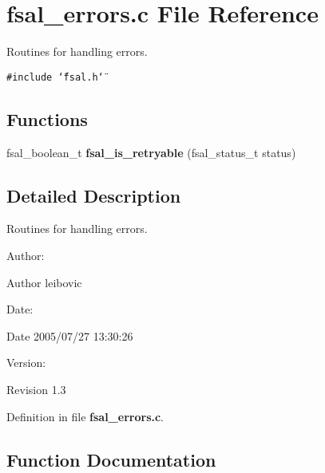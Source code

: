 \section{fsal\_\-errors.c File Reference}
\label{fsal__errors_8c}
Routines for handling errors.  


{\tt \#include \char`\"{}fsal.h\char`\"{}}\par
\subsection*{Functions}
\begin{CompactItemize}
\item 
fsal\_\-boolean\_\-t {\bf fsal\_\-is\_\-retryable} (fsal\_\-status\_\-t status)
\end{CompactItemize}


\subsection{Detailed Description}
Routines for handling errors. 

\begin{Desc}
\item[Author:]\end{Desc}
\begin{Desc}
\item[Author]leibovic \end{Desc}
\begin{Desc}
\item[Date:]\end{Desc}
\begin{Desc}
\item[Date]2005/07/27 13:30:26 \end{Desc}
\begin{Desc}
\item[Version:]\end{Desc}
\begin{Desc}
\item[Revision]1.3 \end{Desc}


Definition in file {\bf fsal\_\-errors.c}.

\subsection{Function Documentation}
